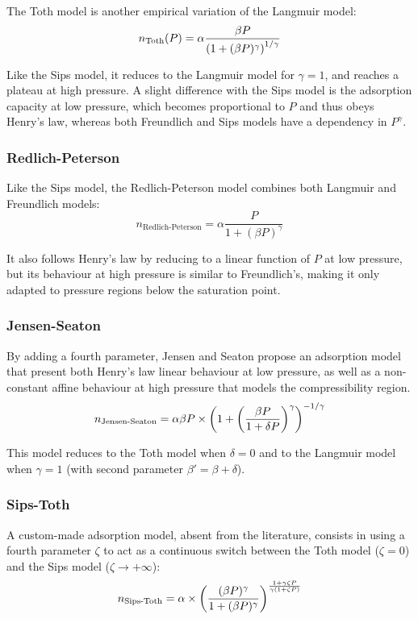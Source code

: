 \documentclass[main.tex]{subfiles}
\begin{document}
The Toth model is another empirical variation of the Langmuir model:
\[n_\text{Toth}(P) = \alpha\frac{\beta P}{\left(1 + (\beta P)^\gamma\right)^{1/\gamma}}\]

Like the Sips model, it reduces to the Langmuir model for $\gamma = 1$, and reaches a plateau at high pressure. A slight difference with the Sips model is the adsorption capacity at low pressure, which becomes proportional to $P$ and thus obeys Henry's law, whereas both Freundlich and Sips models have a dependency in $P^\gamma$.

\subsubsection{Redlich-Peterson}

Like the Sips model, the Redlich-Peterson model combines both Langmuir and Freundlich models:
\[n_\text{Redlich-Peterson} = \alpha\frac{P}{1+ (\beta P)^\gamma}\]

It also follows Henry's law by reducing to a linear function of $P$ at low pressure, but its behaviour at high pressure is similar to Freundlich's, making it only adapted to pressure regions below the saturation point.

\subsubsection{Jensen-Seaton}

By adding a fourth parameter, Jensen and Seaton %
propose an adsorption model that present both Henry's law linear behaviour at low pressure, as well as a non-constant affine behaviour at high pressure that models the compressibility region.
\[n_\text{Jensen-Seaton} = \alpha\beta P\times\left(1 + \left(\frac{\beta P}{1 + \delta P}\right)^\gamma\right)^{-1/\gamma}\]

This model reduces to the Toth model when $\delta = 0$ and to the Langmuir model when $\gamma = 1$ (with second parameter $\beta' = \beta+\delta$).%

\subsubsection{Sips-Toth}

A custom-made adsorption model, absent from the literature, consists in using a fourth parameter $\zeta$ to act as a continuous switch between the Toth model ($\zeta = 0$) and the Sips model ($\zeta \to +\infty$):
\[n_\text{Sips-Toth} = \alpha\times\left(\frac{(\beta P)^\gamma}{1 + (\beta P)^\gamma}\right)^{\frac{1 + \gamma\zeta P}{\gamma(1 + \zeta P)}}\]
\end{document}
